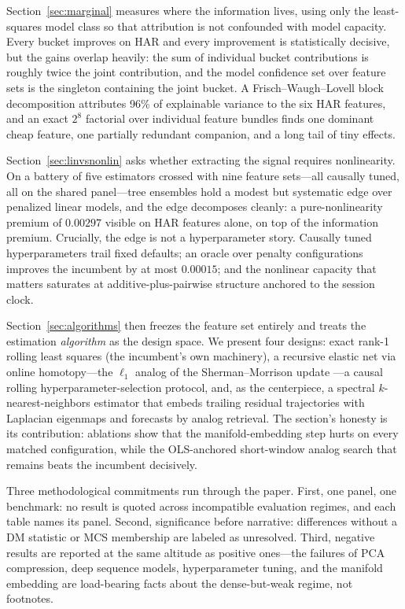 Section~\ref{sec:marginal} measures where the information lives, using only the least-squares model class so that attribution is not confounded with model capacity. Every bucket improves on HAR and every improvement is statistically decisive, but the gains overlap heavily: the sum of individual bucket contributions is roughly twice the joint contribution, and the model confidence set over feature sets is the singleton containing the joint bucket. A Frisch--Waugh--Lovell block decomposition attributes 96\% of explainable variance to the six HAR features, and an exact $2^8$ factorial over individual feature bundles finds one dominant cheap feature, one partially redundant companion, and a long tail of tiny effects.

Section~\ref{sec:linvsnonlin} asks whether extracting the signal requires nonlinearity. On a battery of five estimators crossed with nine feature sets---all causally tuned, all on the shared panel---tree ensembles hold a modest but systematic edge over penalized linear models, and the edge decomposes cleanly: a pure-nonlinearity premium of $0.00297$ visible on HAR features alone, on top of the information premium. Crucially, the edge is not a hyperparameter story. Causally tuned hyperparameters trail fixed defaults; an oracle over penalty configurations improves the incumbent by at most $0.00015$; and the nonlinear capacity that matters saturates at additive-plus-pairwise structure anchored to the session clock.

Section~\ref{sec:algorithms} then freezes the feature set entirely and treats the estimation \emph{algorithm} as the design space. We present four designs: exact rank-1 rolling least squares (the incumbent's own machinery), a recursive elastic net via online homotopy---the $\ell_1$ analog of the Sherman--Morrison update \citep{Garrigues2008}---a causal rolling hyperparameter-selection protocol, and, as the centerpiece, a spectral $k$-nearest-neighbors estimator that embeds trailing residual trajectories with Laplacian eigenmaps \citep{BelkinNiyogi2003} and forecasts by analog retrieval. The section's honesty is its contribution: ablations show that the manifold-embedding step hurts on every matched configuration, while the OLS-anchored short-window analog search that remains beats the incumbent decisively.

Three methodological commitments run through the paper. First, one panel, one benchmark: no result is quoted across incompatible evaluation regimes, and each table names its panel. Second, significance before narrative: differences without a DM statistic or MCS membership are labeled as unresolved. Third, negative results are reported at the same altitude as positive ones---the failures of PCA compression, deep sequence models, hyperparameter tuning, and the manifold embedding are load-bearing facts about the dense-but-weak regime, not footnotes.
